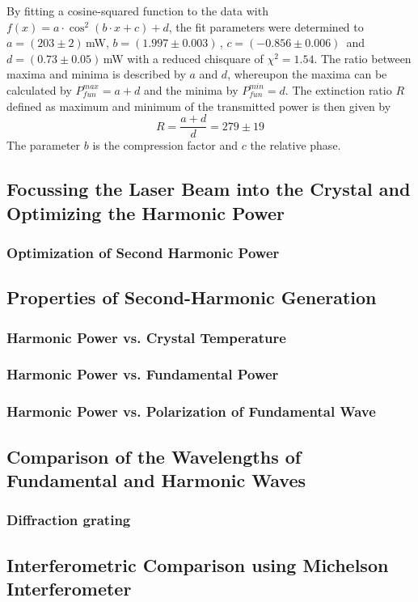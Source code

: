 \documentclass[10pt, a4paper, notitlepage, DIV=15]{scrartcl}
\begin{document}
\newline
By fitting a cosine-squared function to the data with $f(x)=a\cdot \cos^2(b\cdot x+c)+d$, the fit parameters were determined to $a=(203 \pm 2) \,$mW, $b= (1.997 \pm 0.003)\,$, $c = (-0.856 \pm 0.006)\,$ and $d= (0.73 \pm 0.05)\,$mW with a reduced chisquare of $\chi^2=1.54$. The ratio between maxima and minima is described by $a$ and $d$, whereupon the maxima can be calculated by $P^{max}_{fun}=a+d$ and the minima by $P^{min}_{fun}=d$. The extinction ratio $R$ defined as maximum and minimum of the transmitted power is then given by 
\begin{equation}
	R=\frac{a+d}{d}=279\pm 19
\end{equation}
The parameter $b$ is the compression factor and $c$ the relative phase.
\subsection{Focussing the Laser Beam into the Crystal and Optimizing the Harmonic Power}
\subsubsection{Optimization of Second Harmonic Power}
\subsection{Properties of Second-Harmonic Generation}
\subsubsection{Harmonic Power vs. Crystal Temperature}
\subsubsection{Harmonic Power vs. Fundamental Power}
\subsubsection{Harmonic Power vs. Polarization of Fundamental Wave}
\subsection{Comparison of the Wavelengths of Fundamental and Harmonic Waves}
\subsubsection{Diffraction grating} 
\subsection{Interferometric Comparison using Michelson Interferometer}
\end{document}
